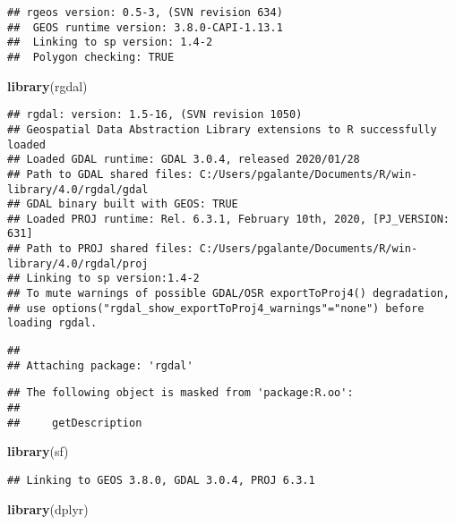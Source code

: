 \documentclass[
]{article}
\newenvironment{Shaded}{\begin{snugshade}}{\end{snugshade}}
\newcommand{\KeywordTok}[1]{\textcolor[rgb]{0.13,0.29,0.53}{\textbf{#1}}}
\newcommand{\NormalTok}[1]{#1}
\begin{document}
\begin{verbatim}
## rgeos version: 0.5-3, (SVN revision 634)
##  GEOS runtime version: 3.8.0-CAPI-1.13.1 
##  Linking to sp version: 1.4-2 
##  Polygon checking: TRUE
\end{verbatim}

\begin{Shaded}
\begin{Highlighting}[]
\KeywordTok{library}\NormalTok{(rgdal)}
\end{Highlighting}
\end{Shaded}

\begin{verbatim}
## rgdal: version: 1.5-16, (SVN revision 1050)
## Geospatial Data Abstraction Library extensions to R successfully loaded
## Loaded GDAL runtime: GDAL 3.0.4, released 2020/01/28
## Path to GDAL shared files: C:/Users/pgalante/Documents/R/win-library/4.0/rgdal/gdal
## GDAL binary built with GEOS: TRUE 
## Loaded PROJ runtime: Rel. 6.3.1, February 10th, 2020, [PJ_VERSION: 631]
## Path to PROJ shared files: C:/Users/pgalante/Documents/R/win-library/4.0/rgdal/proj
## Linking to sp version:1.4-2
## To mute warnings of possible GDAL/OSR exportToProj4() degradation,
## use options("rgdal_show_exportToProj4_warnings"="none") before loading rgdal.
\end{verbatim}

\begin{verbatim}
## 
## Attaching package: 'rgdal'
\end{verbatim}

\begin{verbatim}
## The following object is masked from 'package:R.oo':
## 
##     getDescription
\end{verbatim}

\begin{Shaded}
\begin{Highlighting}[]
\KeywordTok{library}\NormalTok{(sf)}
\end{Highlighting}
\end{Shaded}

\begin{verbatim}
## Linking to GEOS 3.8.0, GDAL 3.0.4, PROJ 6.3.1
\end{verbatim}

\begin{Shaded}
\begin{Highlighting}[]
\KeywordTok{library}\NormalTok{(dplyr)}
\end{Highlighting}
\end{Shaded}
\end{document}
